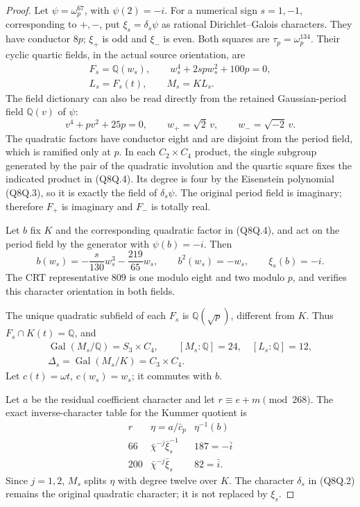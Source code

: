 \begin{proof}
Let $\psi=\omega_p^{67}$, with $\psi(2)=-i$.
For a numerical sign $s=1,-1$, corresponding to $+,-$, put
$\xi_s=\delta_s\psi$ as rational Dirichlet--Galois characters.
They have conductor $8p$; $\xi_+$ is odd and $\xi_-$ is even.
Both squares are $\tau_p=\omega_p^{134}$.
Their cyclic quartic fields, in the actual source orientation, are
\[
 \begin{gathered}
 F_s=\mathbb Q(w_s),\qquad w_s^4+2spw_s^2+100p=0,\\
 L_s=F_s(t),\qquad M_s=KL_s.
 \end{gathered}
 \tag{Q8Q.3}
\]
The field dictionary can also be read directly from the retained
Gaussian-period field $\mathbb Q(v)$ of $\psi$:
\[
 v^4+pv^2+25p=0,\qquad
 w_+=\sqrt2\,v,\qquad w_-=\sqrt{-2}\,v.
 \tag{Q8Q.4}
\]
The quadratic factors have conductor eight and are disjoint from
the period field, which is ramified only at $p$.
In each $C_2\times C_4$ product, the single subgroup generated
by the pair of the quadratic involution and the quartic square
fixes the indicated product in (Q8Q.4).
Its degree is four by the Eisenstein polynomial (Q8Q.3), so it
is exactly the field of $\delta_s\psi$.
The original period field is imaginary; therefore $F_+$ is
imaginary and $F_-$ is totally real.

Let $b$ fix $K$ and the corresponding quadratic factor in (Q8Q.4),
and act on the period field by the generator with $\psi(b)=-i$.
Then
\[
 b(w_s)=-\frac{s}{130}w_s^3-\frac{219}{65}w_s,
 \qquad b^2(w_s)=-w_s,\qquad \xi_s(b)=-i.
 \tag{Q8Q.5}
\]
The CRT representative $809$ is one modulo eight and two modulo
$p$, and verifies this character orientation in both fields.

The unique quadratic subfield of each $F_s$ is
$\mathbb Q(\sqrt p)$, different from $K$.
Thus $F_s\cap K(t)=\mathbb Q$, and
\[
 \begin{gathered}
 \operatorname{Gal}(M_s/\mathbb Q)=S_3\times C_4,
 \qquad[M_s:\mathbb Q]=24,\quad[L_s:\mathbb Q]=12,\\
 \Delta_s=\operatorname{Gal}(M_s/K)=C_3\times C_4.
 \end{gathered}
 \tag{Q8Q.6}
\]
Let $c(t)=\omega t$, $c(w_s)=w_s$; it commutes with $b$.

Let $a$ be the residual coefficient character and let
$r\equiv e+m\pmod{268}$.
The exact inverse-character table for the Kummer quotient is
\[
 \begin{array}{c|c|c}
 r&\eta=a/\bar c_p&\eta^{-1}(b)\\ \hline
 66&\bar\chi^{-j}\bar\xi_s^{-1}&187=-\bar i\\
 200&\bar\chi^{-j}\bar\xi_s&82=\bar i.
 \end{array}
 \tag{Q8Q.7}
\]
Since $j=1,2$, $M_s$ splits $\eta$ with degree twelve over $K$.
The character $\delta_s$ in (Q8Q.2) remains the original
quadratic character; it is not replaced by $\xi_s$.


\end{proof}
